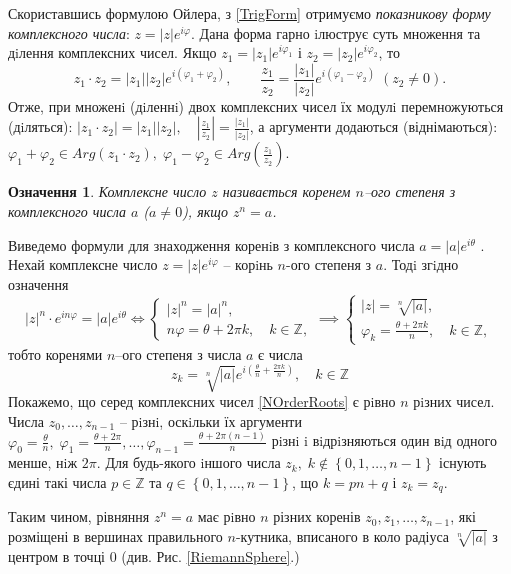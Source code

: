 \documentclass[10pt]{report} %
\newtheorem{definition}{Означення}[section]
\begin{document}
Скориставшись формулою Ойлера, з \eqref{TrigForm} отримуємо \textit{показникову форму комплексного числа}: $z=|z|e^{i\varphi}$.  
Дана форма гарно iлюструє суть множення та дiлення комплексних чисел. Якщо $z_1=|z_1|e^{i\varphi_1}$ і $z_2=|z_2|e^{i\varphi_2}$, то
\[z_1\cdot z_2=|z_1||z_2|e^{i(\varphi_1+\varphi_2)},\qquad \frac{z_1}{z_2}=\frac{|z_1|}{|z_2|}e^{i(\varphi_1-\varphi_2)}\;(z_2\neq 0).\]
Отже, при множенi (дiленнi) двох комплексних чисел їх модулi перемножуються (дiляться): $|z_1\cdot z_2|=|z_1||z_2|,\quad |\frac{z_1}{z_2}|=
\frac{|z_1|}{|z_2|}$, а аргументи додаються (віднімаються): $\varphi_1+\varphi_2\in Arg(z_1\cdot z_2),\;\varphi_1-\varphi_2\in Arg(\frac{z_1}{z_2})$.
\begin{definition}
Комплексне число $z$ називається коренем $n$–ого степеня з комплексного числа $a$ ($a \neq 0$), якщо $z^n = a$.
\end{definition}

Виведемо формули для знаходження коренiв з комплексного числа $a = |a| e^{i\theta}$ . Нехай
комплексне число $z = |z| e^{i\varphi}$ -- корiнь $n$-ого степеня з $a$. Тодi згiдно означення
\[{|z|}^n\cdot e^{in\varphi}=|a|e^{i\theta}\iff
\begin{cases}
{|z|}^n={|a|}^n,\\
n\varphi=\theta+2\pi k,\quad k\in\mathbb{Z},
\end{cases}
\implies
\begin{cases}
|z|=\sqrt[n]{|a|},\\
\varphi_k=\frac{\theta+2\pi k}{n},\quad k\in\mathbb{Z},
\end{cases}
\]
тобто коренями $n$–ого степеня з числа $a$ є числа
\begin{equation}\label{NOrderRoots}z_k=\sqrt[n]{|a|}e^{i\left(\frac{\theta}{n}+\frac{2\pi k}{n}\right)},\quad k\in\mathbb{Z}\end{equation}
Покажемо, що серед комплексних чисел \eqref{NOrderRoots} є рiвно $n$ рiзних чисел. Числа $z_0,\dots,z_{n-1}$ -- рiзнi, оскiльки їх аргументи
$\varphi_0=\frac{\theta}{n},\;\varphi_1=\frac{\theta+2\pi}{n},\dots,\varphi_{n-1}=\frac{\theta+2\pi(n-1)}{n}$ рiзнi i вiдрiзняються один вiд одного
 менше, нiж $2\pi$. Для будь-якого iншого числа $z_k,\;k\notin \left\{0,1,\dots,n-1\right\}$ існують єдині такі числа $p\in\mathbb{Z}$ та
$q\in\left\{0,1,\dots,n-1\right\}$, що $k=pn+q$ і $z_k=	z_q$.

Таким чином, рівняння $z^n = a$ має рiвно $n$ різних коренів $z_0,z_1,\dots,z_{n-1}$, які розміщені в вершинах правильного $n$-кутника,
 вписаного в коло радіуса $\sqrt[n]{|a|}$ з центром в точці $0$ (див. Рис. \ref{RiemannSphere}.) %
\end{document}
